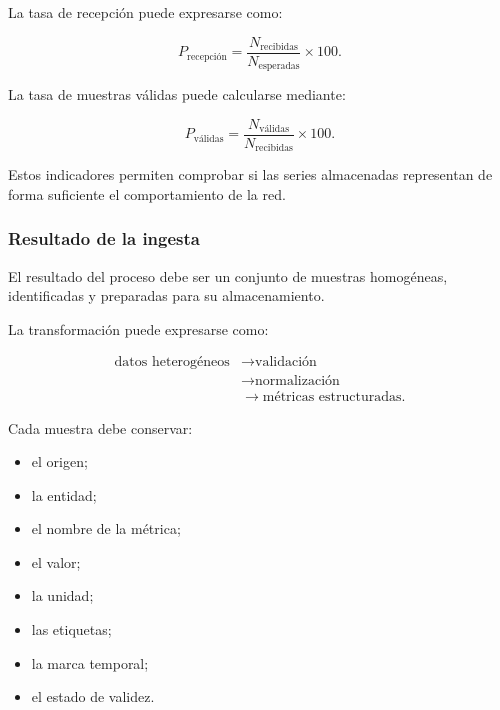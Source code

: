 La tasa de recepción puede expresarse como:

\[
    P_{\mathrm{recepción}}
    =
    \frac{
        N_{\mathrm{recibidas}}
    }{
        N_{\mathrm{esperadas}}
    }
    \times
    100.
\]

La tasa de muestras válidas puede calcularse mediante:

\[
    P_{\mathrm{válidas}}
    =
    \frac{
        N_{\mathrm{válidas}}
    }{
        N_{\mathrm{recibidas}}
    }
    \times
    100.
\]

Estos indicadores permiten comprobar si las series almacenadas
representan de forma suficiente el comportamiento de la red.


\subsubsection*{Resultado de la ingesta}

El resultado del proceso debe ser un conjunto de muestras homogéneas,
identificadas y preparadas para su almacenamiento.

La transformación puede expresarse como:

\[
\begin{aligned}
    \text{datos heterogéneos}
    &\longrightarrow
    \text{validación}\\
    &\longrightarrow
    \text{normalización}\\
    &\longrightarrow
    \text{métricas estructuradas}.
\end{aligned}
\]

Cada muestra debe conservar:

\begin{itemize}
    \item el origen;

    \item la entidad;

    \item el nombre de la métrica;

    \item el valor;

    \item la unidad;

    \item las etiquetas;

    \item la marca temporal;

    \item el estado de validez.
\end{itemize}

